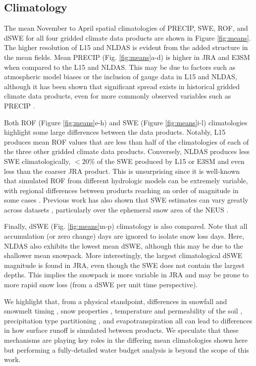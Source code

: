 \documentclass[draft]{agujournal2019}
\begin{document}
\subsection{Climatology}

The mean November to April spatial climatologies of PRECIP, SWE, ROF, and dSWE for all four gridded climate data products are shown in Figure \ref{fig:means}. 
The higher resolution of L15 and NLDAS is evident from the added structure in the mean fields. 
Mean PRECIP (Fig. \ref{fig:means}a-d) is higher in JRA and E3SM when compared to the L15 and NLDAS. 
This may be due to factors such as atmospheric model biases or the inclusion of gauge data in L15 and NLDAS, although it has been shown that significant spread exists in historical gridded climate data products, even for more commonly observed variables such as PRECIP \citep{gutmann2012comparison,livneh2014filling,henn2018an}.

Both ROF (Figure \ref{fig:means}e-h) and SWE (Figure \ref{fig:means}i-l) climatologies highlight some large differences between the data products. 
Notably, L15 produces mean ROF values that are less than half of the climatologies of each of the three other gridded climate data products. 
Conversely, NLDAS produces less SWE climatologically, $<$20\% of the SWE produced by L15 or E3SM and even less than the coarser JRA product. 
This is unsurprising since it is well-known that simulated ROF from different hydrologic models can be extremely variable, with regional differences between products reaching an order of magnitude in some cases \citep{gudmundsson2012comparing,sood2015global,beck2017global}. 
Previous work has also shown that SWE estimates can vary greatly across datasets \citep{lundquist2015high,Rhoades2018a}, particularly over the ephemeral snow area of the NEUS \citep{mccrary2017evaluation,mccrary2022projections}. 

Finally, dSWE (Fig. \ref{fig:means}m-p) climatology is also compared. 
Note that all accumulation (or zero change) days are ignored to isolate snow loss days. 
Here, NLDAS also exhibits the lowest mean dSWE, although this may be due to the shallower mean snowpack. 
More interestingly, the largest climatological dSWE magnitude is found in JRA, even though the SWE does not contain the largest depths. 
This implies the snowpack is more variable in JRA and may be prone to more rapid snow loss (from a dSWE per unit time perspective).

We highlight that, from a physical standpoint, differences in snowfall and snowmelt timing \citep{rauscher2008future,mccabe2005trends}, snow properties \citep{brown2006evaluation}, temperature and permeability of the soil \citep{niu2006effects}, precipitation type partitioning \citep{knowles2006trends}, and evapotranspiration \citep{zheng2019on} all can lead to differences in how surface runoff is simulated between products. We speculate that these mechanisms are playing key roles in the differing mean climatologies shown here but performing a fully-detailed water budget analysis is beyond the scope of this work.
\end{document}
